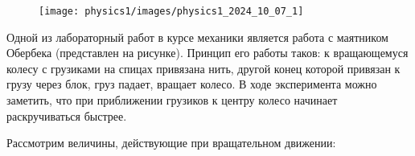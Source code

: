 \documentclass[12pt]{article}
\begin{document}
    \begin{minipage}{\textwidth}
        \begin{figure}
            \texttt{[image: physics1/images/physics1\_2024\_10\_07\_1]}
        \end{figure}

        Одной из лабораторный работ в курсе механики является работа с маятником Обербека (представлен на рисунке).
        Принцип его работы таков: к вращающемуся колесу с грузиками на спицах привязана нить, другой конец которой
        привязан к грузу через блок, груз падает, вращает колесо. В ходе эксперимента можно заметить, что при приближении
        грузиков к центру колесо начинает раскручиваться быстрее.

    \end{minipage}

    \mediumvspace

    Рассмотрим величины, действующие при вращательном движении:

    \smallvspace
\end{document}

